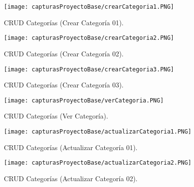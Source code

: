 \documentclass[titlepage, 12pt]{article}
\begin{document}
    \begin{figure}[h]
        \caption{CRUD Categorías (Crear Categoría 01).}
        \centering
        \texttt{[image: capturasProyectoBase/crearCategoria1.PNG]} \par\vspace{0.5cm}
    \end{figure}
    
    \clearpage
    
    \begin{figure}[h]
        \caption{CRUD Categorías (Crear Categoría 02).}
        \centering
        \texttt{[image: capturasProyectoBase/crearCategoria2.PNG]} \par\vspace{0.5cm}
    \end{figure}
    
    \begin{figure}[h]
        \caption{CRUD Categorías (Crear Categoría 03).}
        \centering
        \texttt{[image: capturasProyectoBase/crearCategoria3.PNG]} \par\vspace{0.5cm}
    \end{figure}
    
    \clearpage
    
     \begin{figure}[h]
        \caption{CRUD Categorías (Ver Categoría).}
        \centering
        \texttt{[image: capturasProyectoBase/verCategoria.PNG]} \par\vspace{0.5cm}
    \end{figure}
    
     \begin{figure}[h]
        \caption{CRUD Categorías (Actualizar Categoría 01).}
        \centering
        \texttt{[image: capturasProyectoBase/actualizarCategoria1.PNG]} \par\vspace{0.5cm}
    \end{figure}
    
    \clearpage
    
    \begin{figure}[h]
        \caption{CRUD Categorías (Actualizar Categoría 02).}
        \centering
        \texttt{[image: capturasProyectoBase/actualizarCategoria2.PNG]} \par\vspace{0.5cm}
    \end{figure}
    
\end{document}
